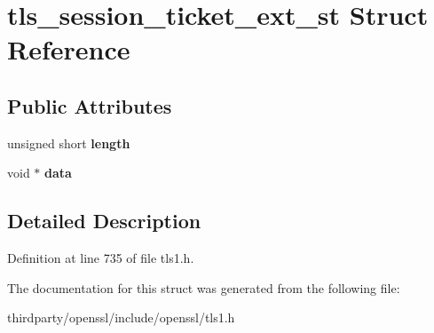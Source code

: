 \hypertarget{structtls__session__ticket__ext__st}{}\section{tls\+\_\+session\+\_\+ticket\+\_\+ext\+\_\+st Struct Reference}
\label{structtls__session__ticket__ext__st}
\subsection*{Public Attributes}
\begin{DoxyCompactItemize}
\item 
\mbox{\label{structtls__session__ticket__ext__st_ab4a3be707090c71d78abec6456b8a3a9}} 
unsigned short {\bfseries length}
\item 
\mbox{\label{structtls__session__ticket__ext__st_a06405cfdcffe766026c389d9499602a9}} 
void $\ast$ {\bfseries data}
\end{DoxyCompactItemize}


\subsection{Detailed Description}


Definition at line 735 of file tls1.\+h.



The documentation for this struct was generated from the following file\+:\begin{DoxyCompactItemize}
\item 
thirdparty/openssl/include/openssl/tls1.\+h\end{DoxyCompactItemize}
